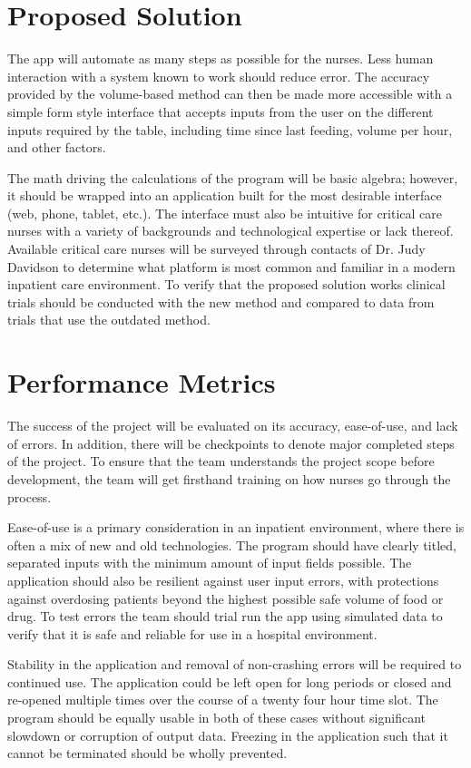 \documentclass[fullpage,10pt, onecolumn, draftclsnofoot]{IEEEtran}
\begin{document}
\section{Proposed Solution}
The app will automate as many steps as possible for the nurses. Less human interaction with a system known to work should reduce error. 
The accuracy provided by the volume-based method can then be made more accessible with 
a simple form style interface that accepts inputs from the user on the different inputs required
by the table, including time since last feeding, volume per hour, and other factors.

The math driving the calculations of the program will be basic algebra; however, it should be wrapped into an application built
for the most desirable interface (web, phone, tablet, etc.). The interface must also be intuitive for
critical care nurses with a variety of backgrounds and technological expertise or lack thereof.
Available
critical care nurses will be surveyed through contacts of Dr. Judy Davidson to determine what 
platform is most common and familiar in a modern inpatient care environment.
To verify that the proposed solution
works clinical trials should be conducted with the new method and compared to data from trials 
that use the outdated method.

\section{Performance Metrics}
The success of the project will be evaluated on its accuracy, ease-of-use, and lack of errors.
In addition, there will be checkpoints to denote major completed steps of the project.
To ensure that the team understands the project scope before development, the team will get firsthand 
training on how nurses go through the process.

Ease-of-use is a primary consideration in an inpatient environment, where there is often a mix of new and old technologies. The program should have clearly titled, separated inputs with the minimum amount of input fields
possible. The application should also
be resilient against user input errors, with protections against overdosing patients beyond the
highest possible safe volume of food or drug.
To test errors the team should trial run the app using simulated data to verify that it is safe and reliable for use in a hospital environment. 

Stability in the application and removal of non-crashing errors will be required to continued use.
The application could be left open for long periods or closed and re-opened multiple times 
over the course of a twenty four hour time slot. The program should be equally usable in both 
of these cases without significant slowdown or corruption of output data. Freezing in the application
such that it cannot be terminated should be wholly prevented.
\end{document}
